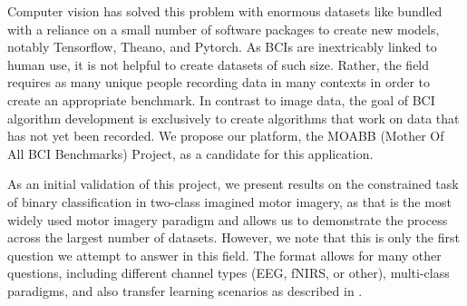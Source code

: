 Computer vision has solved this problem with enormous datasets like
\cite{Deng2009} bundled with a reliance on a small number of software
packages to create new models, notably Tensorflow, Theano, and
Pytorch. As BCIs are inextricably linked to human use, it is not
helpful to create datasets of such size. Rather, the field requires
as many unique people recording data in many contexts in order to
create an appropriate benchmark. In contrast to image data, the goal
of BCI algorithm development is exclusively to create algorithms that
work on data that has not yet been recorded. We propose our platform, the MOABB
(Mother Of All BCI Benchmarks) Project, as a candidate for this application. 

As an initial validation of this project, we present results on the
constrained task of binary classification in two-class imagined motor
imagery, as that is the most widely used motor imagery paradigm and
allows us to demonstrate the process across the largest number of
datasets.  However, we note that this is only the first question we
attempt to answer in this field. The format allows for many other questions,
including different channel types (EEG, fNIRS, or other), multi-class
paradigms, and also transfer learning scenarios as described in
\cite{Jayaram2016}. 

